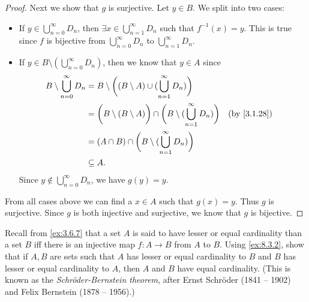 \begin{proof}
  Next we show that \(g\) is surjective.
  Let \(y \in B\).
  We split into two cases:
  \begin{itemize}
    \item If \(y \in \bigcup_{n = 0}^\infty D_n\), then \(\exists x \in \bigcup_{n = 1}^\infty D_n\) such that \(f^{-1}(x) = y\).
          This is true since \(f\) is bijective from \(\bigcup_{n = 0}^\infty D_n\) to \(\bigcup_{n = 1}^\infty D_n\).
    \item If \(y \in B \setminus (\bigcup_{n = 0}^\infty D_n)\), then we know that \(y \in A\) since
          \begin{align*}
            B \setminus \bigcup_{n = 0}^\infty D_n & = B \setminus \bigg((B \setminus A) \cup (\bigcup_{n = 1}^\infty D_n)\bigg)                                          \\
                                                   & = \bigg(B \setminus (B \setminus A)\bigg) \cap \bigg(B \setminus (\bigcup_{n = 1}^\infty D_n)\bigg) &  & \by{3.1.28} \\
                                                   & = (A \cap B) \cap \bigg(B \setminus (\bigcup_{n = 1}^\infty D_n)\bigg)                                               \\
                                                   & \subseteq A.
          \end{align*}
          Since \(y \notin \bigcup_{n = 0}^\infty D_n\), we have \(g(y) = y\).
  \end{itemize}
  From all cases above we can find a \(x \in A\) such that \(g(x) = y\).
  Thus \(g\) is surjective.
  Since \(g\) is both injective and surjective, we know that \(g\) is bijective.
\end{proof}

\begin{ex}\label{ex:8.3.3}
  Recall from \cref{ex:3.6.7} that a set \(A\) is said to have lesser or equal cardinality than a set \(B\) iff there is an injective map \(f : A \to B\) from \(A\) to \(B\).
  Using \cref{ex:8.3.2}, show that if \(A, B\) are sets such that \(A\) has lesser or equal cardinality to \(B\) and \(B\) has lesser or equal cardinality to \(A\), then \(A\) and \(B\) have equal cardinality.
  (This is known as the \emph{Schröder-Bernstein theorem}, after Ernst Schröder (1841 -- 1902) and Felix Bernstein (1878 -- 1956).)
\end{ex}

